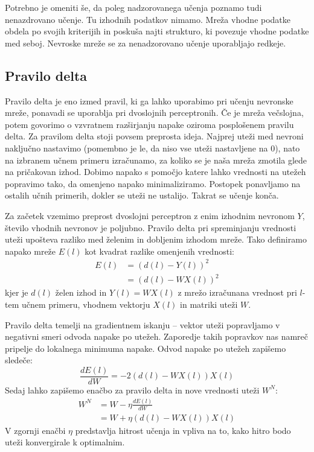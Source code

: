 \documentclass[mat1]{fmfdelo}
\begin{document}
Potrebno je omeniti še, da poleg nadzorovanega učenja poznamo tudi nenazdrovano učenje. Tu izhodnih podatkov nimamo. Mreža vhodne podatke obdela po svojih kriterijih in poskuša najti strukturo, ki povezuje vhodne podatke med seboj. Nevroske mreže se za nenadzorovano učenje uporabljajo redkeje.
\subsection{Pravilo delta}
Pravilo delta je eno izmed pravil, ki ga lahko uporabimo pri učenju nevronske mreže, ponavadi se uporablja pri dvoslojnih perceptronih. Če je mreža večslojna, potem govorimo o vzvratnem razširjanju napake oziroma posplošenem pravilu delta. Za pravilom delta stoji povsem preprosta ideja. Najprej uteži med nevroni naključno nastavimo (pomembno je le, da niso vse uteži nastavljene na 0), nato na izbranem učnem primeru izračunamo, za koliko se je naša mreža zmotila glede na pričakovan izhod. Dobimo napako s pomočjo katere lahko vrednosti na utežeh popravimo tako, da omenjeno napako minimaliziramo. Postopek ponavljamo na ostalih učnih primerih, dokler se uteži ne ustalijo. Takrat se učenje konča.

Za začetek vzemimo preprost dvoslojni perceptron z enim izhodnim nevronom $Y$, število vhodnih nevronov je poljubno. Pravilo delta pri spreminjanju vrednosti uteži upošteva razliko med želenim in dobljenim izhodom mreže. Tako definiramo napako mreže $E(l)$ kot kvadrat razlike omenjenih vrednosti:
%
\begin{equation}
\begin{aligned}
E(l) &= (d(l)-Y(l))^2 \\
&= (d(l)-WX(l))^2
\label{eq:napaka}
\end{aligned}
\end{equation}
%
kjer je $d(l)$ želen izhod in $Y(l)= WX(l)$ z mrežo izračunana vrednost pri $l$-tem učnem primeru, vhodnem vektorju $X(l)$ in matriki uteži $W$.

Pravilo delta temelji na gradientnem iskanju -- vektor uteži popravljamo v negativni smeri odvoda napake po utežeh. Zaporedje takih popravkov nas namreč pripelje do lokalnega minimuma napake. Odvod napake po utežeh zapišemo sledeče:
%
\begin{equation*}
\frac{dE(l)}{dW}= -2(d(l)-WX(l))X(l)
\end{equation*}
%
Sedaj lahko zapišemo enačbo za pravilo delta in nove vrednosti uteži $W^{N}$:
%
\begin{equation}
\begin{aligned}
W^{N} &= W - \eta\frac{dE(l)}{dW} \\
&= W + \eta(d(l)-WX(l))X(l)
\label{utezi}
\end{aligned}
\end{equation}
%
V zgornji enačbi $\eta$ predstavlja hitrost učenja in vpliva na to, kako hitro bodo uteži konvergirale k optimalnim. 
%
\\
\end{document}
